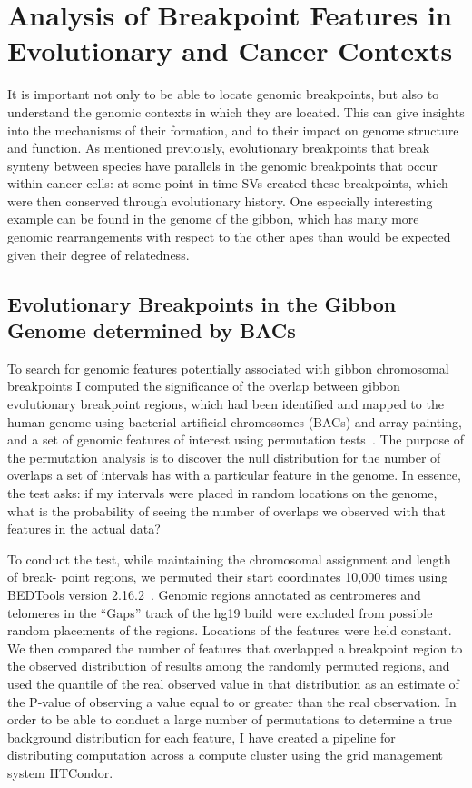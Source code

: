 \chapter{Analysis of Breakpoint Features in Evolutionary and Cancer Contexts}
\label{chap_breakpoint_analysis}
It is important not only to be able to locate genomic breakpoints, but also to understand the genomic contexts in which they are located. This can give insights into the mechanisms of their formation, and to their impact on genome structure and function. As mentioned previously, evolutionary breakpoints that break synteny between species have parallels in the genomic breakpoints that occur within cancer cells: at some point in time SVs created these breakpoints, which were then conserved through evolutionary history. One especially interesting example can be found in the genome of the gibbon, which has many more genomic rearrangements with respect to the other apes than would be expected given their degree of relatedness.

\section{Evolutionary Breakpoints in the Gibbon Genome determined by BACs}

To search for genomic features potentially associated with gibbon chromosomal breakpoints I computed the significance of the overlap between gibbon evolutionary breakpoint regions, which had been identified and mapped to the human genome using bacterial artificial chromosomes (BACs) and array painting, and a set of genomic features of interest using permutation tests~\cite{Capozzi:2012bb}. The purpose of the permutation analysis is to discover the null distribution for the number of overlaps a set of intervals has with a particular feature in the genome. In essence, the test asks: if my intervals were placed in random locations on the genome, what is the probability of seeing the number of overlaps we observed with that features in the actual data? 

To conduct the test, while maintaining the chromosomal assignment and length of break- point regions, we permuted their start coordinates 10,000 times using BEDTools version 2.16.2~\cite{Quinlan:2010km}. Genomic regions annotated as centromeres and telomeres in the ``Gaps'' track of the hg19 build were excluded from possible random placements of the regions. Locations of the features were held constant. We then compared the number of features that overlapped a breakpoint region to the observed distribution of results among the randomly permuted regions, and used the quantile of the real observed value in that distribution as an estimate of the P-value of observing a value equal to or greater than the real observation. In order to be able to conduct a large number of permutations to determine a true background distribution for each feature, I have created a pipeline for distributing computation across a compute cluster using the grid management system HTCondor.

